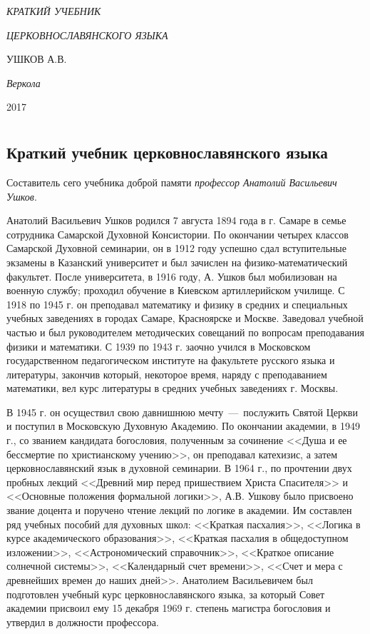 \documentclass[11pt,a4paper,oneside]{memoir}
\newcommand*{\labelit}[1]{\phantomsection\label{#1}}
\newlength{\tpheight}\setlength{\tpheight}{0.9\textheight}
\newlength{\txtheight}\setlength{\txtheight}{0.9\tpheight}
\newlength{\tpwidth}\setlength{\tpwidth}{0.9\textwidth}
\newlength{\txtwidth}\setlength{\txtwidth}{0.9\tpwidth}
\newlength{\drop}
\newenvironment{showtitle}{%
    \begin{boxminipage}[c][\tpheight]{\tpwidth}
        \centering\begin{vplace}\begin{minipage}[c][\txtheight]{\txtwidth}}%
            {\end{minipage}\end{vplace}\end{boxminipage}}
\newcommand*{\titleCC}{\begingroup%
    \drop=0.1\txtheight
    \vspace*{\drop}
    \centering 
    {\Large\itshape КРАТКИЙ УЧЕБНИК}\\[0.5\drop]
    {\textcolor{Red}{\HUGE\bfseries {\slv{✠}}}}\par
    \vspace{\drop}
    {\LARGE\itshape ЦЕРКОВНОСЛАВЯНСКОГО ЯЗЫКА}\par
    \vfill
    {\Large УШКОВ А.В.}\par
    \vfill
    {\itshape Веркола}\par
    {\scshape 2017}\par
    \vspace*{\drop}
    \endgroup}
\begin{document}
\begin{titlingpage}
	\begin{showtitle}
		\titleCC
	\end{showtitle}
	\labelit{CC}
	{
		\par\vspace{0.2\baselineskip}
	}
\end{titlingpage}

\tableofcontents*

\chapter*{}
\section*{Краткий учебник церковнославянского языка}
\label{sec:brief}

Составитель сего учебника доброй памяти \emph{профессор Анатолий Васильевич Ушков}.

Анатолий Васильевич Ушков родился 7 августа 1894 года в г. Самаре в семье сотрудника Самарской Духовной Консистории. По окончании четырех классов Самарской Духовной семинарии, он в 1912 году успешно сдал вступительные экзамены в Казанский университет и был зачислен на физико-математический факультет. После университета, в 1916 году, А. Ушков был мобилизован на военную службу; проходил обучение в Киевском артиллерийском училище. С 1918 по 1945 г. он преподавал математику и физику в средних и специальных учебных заведениях в городах Самаре, Красноярске и Москве. Заведовал учебной частью и был руководителем методических совещаний по вопросам преподавания физики и математики. С 1939 по 1943 г. заочно учился в Московском государственном педагогическом институте на факультете русского языка и литературы, закончив который, некоторое время, наряду с преподаванием математики, вел курс литературы в средних учебных заведениях г. Москвы.

В 1945 г. он осуществил свою давнишнюю мечту~---~послужить Святой Церкви и поступил в Московскую Духовную Академию. По окончании академии, в 1949 г., со званием кандидата богословия, полученным за сочинение <<Душа и ее бессмертие по христианскому учению>>, он преподавал катехизис, а затем церковнославянский язык в духовной семинарии. В 1964 г., по прочтении двух пробных лекций <<Древний мир перед пришествием Христа Спасителя>> и <<Основные положения формальной логики>>, А.В. Ушкову было присвоено звание доцента и поручено чтение лекций по логике в академии. Им составлен ряд учебных пособий для духовных школ: <<Краткая пасхалия>>, <<Логика в курсе академического образования>>, <<Краткая пасхалия в общедоступном изложении>>, <<Астрономический справочник>>, <<Краткое описание солнечной системы>>, <<Календарный счет времени>>, <<Счет и мера с древнейших времен до наших дней>>. Анатолием Васильевичем был подготовлен учебный курс церковнославянского языка, за который Совет академии присвоил ему 15 декабря 1969 г. степень магистра богословия и утвердил в должности профессора.
\end{document}

